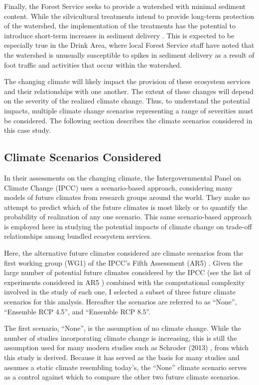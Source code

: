 Finally, the Forest Service seeks to provide a watershed with minimal sediment content. While the silvicultural treatments intend to provide long-term protection of the watershed, the implementation of the treatments has the potential to introduce short-term increases in sediment delivery \cite{o2005conceptual}. This is expected to be especially true in the Drink Area, where local Forest Service staff have noted that the watershed is unusually susceptible to spikes in sediment delivery as a result of foot traffic and activities that occur within the watershed.

The changing climate will likely impact the provision of these ecosystem services and their relationships with one another. The extent of these changes will depend on the severity of the realized climate change. Thus, to understand the potential impacts, multiple climate change scenarios representing a range of severities must be considered. The following section describes the climate scenarios considered in this case study.

\subsection{Climate Scenarios Considered}
In their assessments on the changing climate, the Intergovernmental Panel on Climate Change (IPCC) uses a scenario-based approach, considering many models of future climates from research groups around the world. They make no attempt to predict which of the future climates is most likely or to quantify the probability of realization of any one scenario. This same scenario-based approach is employed here in studying the potential impacts of climate change on trade-off relationships among bundled ecosystem services.

Here, the alternative future climates considered are climate scenarios from the first working group (WG1) of the IPCC's Fifth Assessment (AR5) \cite{ipcc2013climate}. Given the large number of potential future climates considered by the IPCC (see the list of experiments considered in AR5 \cite{ipccListOfAR5Models}) combined with the computational complexity involved in the study of each one, I selected a subset of three future climate scenarios for this analysis. Hereafter the scenarios are referred to as ``None'', ``Ensemble RCP 4.5'', and ``Ensemble RCP 8.5''.

The first scenario, ``None'', is the assumption of no climate change. While the number of studies incorporating climate change is increasing, this is still the assumption used for many modern studies such as Schroder (2013) \cite{schroder2016multi}, from which this study is derived. Because it has served as the basis for many studies and assumes a static climate resembling today's, the ``None'' climate scenario serves as a control against which to compare the other two future climate scenarios.

